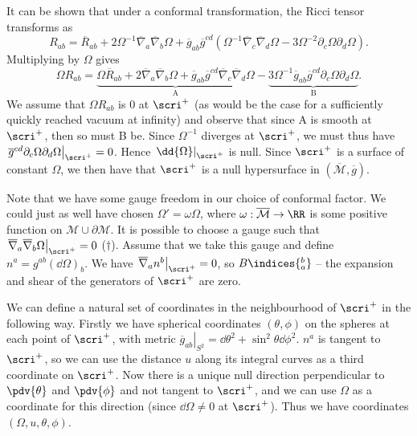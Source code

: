\documentclass{jknotes}
\begin{document}
It can be shown that under a conformal transformation, the Ricci tensor transforms as 
\begin{equation}
    R_{ab}=\overline{R}_{ab} + 2\Omega^{-1}\overline{\nabla}_a\overline{\nabla}_b\Omega + \overline{g}_{ab}\overline{g}^{cd}\left(\Omega^{-1}\overline{\nabla}_c\overline{\nabla}_d\Omega - 3\Omega^{-2}\partial_c\Omega\partial_d\Omega\right).
\end{equation}
Multiplying by \(\Omega\) gives
\begin{equation}
    \Omega R_{ab} = \underbrace{\Omega\overline{R}_{ab} + 2\overline{\nabla}_a\overline{\nabla}_b\Omega + \overline{g}_{ab}\overline{g}^{cd}\overline{\nabla}_c\overline{\nabla}_d\Omega}_{\text{A}} - \underbrace{3\Omega^{-1}\overline{g}_{ab}\overline{g}^{cd}\partial_c\Omega\partial_d\Omega}_{\text{B}}.
\end{equation}
We assume that \(\Omega R_{ab}\) is 0 at \(\scri^+\) (as would be the case for a sufficiently quickly reached vacuum at infinity) and observe that since A is smooth at \(\scri^+\), then so must B be. Since \(\Omega^{-1}\) diverges at \(\scri^+\), we must thus have \(\left.\overline{g}^{cd}\partial_c\Omega\partial_d\Omega\right|_{\scri^+}=0\). Hence \(\left.\dd{\Omega}\right|_{\scri^+}\) is null. Since \(\scri^+\) is a surface of constant \(\Omega\), we then have that \(\scri^+\) is a null hypersurface in \((\overline{\mathcal{M}},\overline{g})\).

Note that we have some gauge freedom in our choice of conformal factor. We could just as well have chosen \(\Omega'=\omega\Omega\), where \(\omega:\overline{\mathcal{M}}\to\RR\) is some positive function on \(\mathcal{M}\cup\partial\mathcal{M}\). It is possible to choose a gauge such that \(\left.\overline{\nabla}_a\overline{\nabla}_b\Omega\right|_{\scri^+} = 0\) (\(\dagger\)). Assume that we take this gauge and define \(n^a = g^{ab}(\dd{\Omega})_b\). We have \(\left.\overline{\nabla}_an^b\right|_{\scri^+}=0\), so \(B\indices{^b_a}\) -- the expansion and shear of the generators of \(\scri^+\) are zero.

We can define a natural set of coordinates in the neighbourhood of \(\scri^+\) in the following way. Firstly we have spherical coordinates \((\theta,\phi)\) on the spheres at each point of \(\scri^+\), with metric \(\left.\overline{g}_{ab}\right|_{S^2} = \dd{\theta}^2+\sin^2\theta\dd{\phi}^2\). \(n^a\) is tangent to \(\scri^+\), so we can use the distance \(u\) along its integral curves as a third coordinate on \(\scri^+\). Now there is a unique null direction perpendicular to \(\pdv{\theta}\) and \(\pdv{\phi}\) and not tangent to \(\scri^+\), and we can use \(\Omega\) as a coordinate for this direction (since \(\dd{\Omega}\ne0\) at \(\scri^+\)). Thus we have coordinates \((\Omega,u,\theta,\phi)\).
\end{document}
